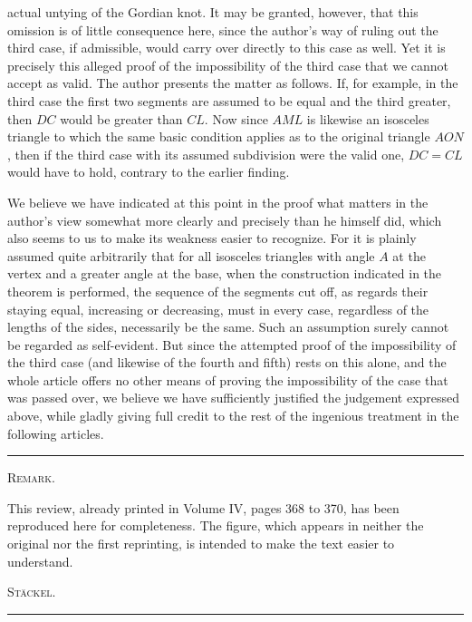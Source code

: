 actual untying of the Gordian knot. It may be granted, however, that this omission
is of little consequence here, since the author's way of ruling out the
third case, if admissible, would carry over directly to this case as well.
Yet it is precisely this alleged proof of the impossibility of the third case that we cannot
accept as valid. The author presents the matter as follows. If, for example, in the third case
the first two segments are assumed to be equal and the third greater, then
$DC$ would be greater than $CL$. Now since $AML$ is likewise an isosceles triangle
to which the same basic condition applies as to the original triangle $AON$, then if
the third case with its assumed subdivision were the valid one, $DC=CL$ would have to hold,
contrary to the earlier finding.

We believe we have indicated at this point in the proof what matters in the author's view somewhat
more clearly and precisely than he himself did,
which also seems to us to make its weakness easier to recognize. For
it is plainly assumed quite arbitrarily that for all isosceles triangles with
angle $A$ at the vertex and a greater angle at the base, when the construction indicated in the theorem
is performed, the sequence of the segments cut off, as regards
their staying equal, increasing or decreasing, must in every case, regardless of the lengths
of the sides, necessarily be the same. Such an assumption surely cannot be regarded as self-evident.
But since the attempted proof of the impossibility
of the third case (and likewise of the fourth and fifth) rests on this alone, and the whole article
offers no other means of proving the impossibility of the case that was passed over,
we believe we have sufficiently justified the judgement expressed above,
while gladly giving full credit to the rest of the ingenious treatment in the following
articles.

\begin{center}\rule{3cm}{0.4pt}\end{center}

\begin{center}\textsc{Remark.}\end{center}

{\small
This review, already printed in Volume IV, pages 368 to 370, has been reproduced here
for completeness. The figure, which appears in neither the original nor the first
reprinting, is intended to make the text easier to understand.

\begin{flushright}\textsc{Stäckel.}\end{flushright}
}

\begin{center}\rule{3cm}{0.4pt}\end{center}
